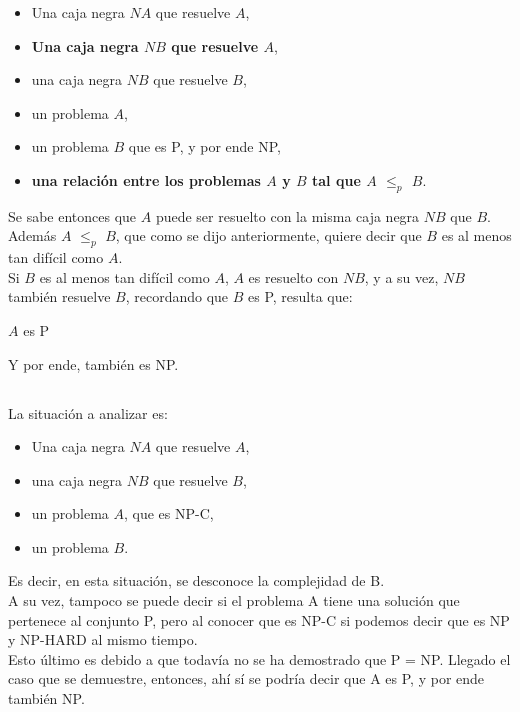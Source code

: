 \begin{itemize}
    \item Una caja negra $NA$ que resuelve $A$,
    \item\textbf{Una caja negra $NB$ que resuelve $A$},
    \item una caja negra $NB$ que resuelve $B$,
    \item un problema $A$,
    \item un problema $B$ que es P, y por ende NP,
    \item \textbf{una relación entre los problemas $A$ y $B$ tal que $A$ $\leq_{p}$ $B$}.
\end{itemize}

Se sabe entonces que $A$ puede ser resuelto con la misma caja negra $NB$ que $B$. Además $A$ $\leq_{p}$ $B$, que como se dijo anteriormente, quiere decir que $B$ es al menos tan difícil como $A$.\\

Si $B$ es al menos tan difícil como $A$, $A$ es resuelto con $NB$, y a su vez, $NB$ también resuelve $B$, recordando que $B$ es P, resulta que:

\begin{center}
$A$ es P\\
\end{center}

Y por ende, también es NP.

\subsection{}
La situación a analizar es:

\begin{itemize}
    \item Una caja negra $NA$ que resuelve $A$,
    \item una caja negra $NB$ que resuelve $B$,
    \item un problema $A$, que es NP-C,
    \item un problema $B$.
\end{itemize}

Es decir, en esta situación, se desconoce la complejidad de B.\\

A su vez, tampoco se puede decir si el problema A tiene una solución que pertenece al conjunto P, pero al conocer que es NP-C si podemos decir que es NP y NP-HARD al mismo tiempo.\\

Esto último es debido a que todavía no se ha demostrado que P = NP. Llegado el caso que se demuestre, entonces, ahí sí se podría decir que A es P, y por ende también NP. 

